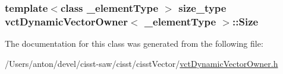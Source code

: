 \subsubsection[{Size}]{\setlength{\rightskip}{0pt plus 5cm}template$<$class \+\_\+element\+Type $>$ size\+\_\+type {\bf vct\+Dynamic\+Vector\+Owner}$<$ \+\_\+element\+Type $>$\+::Size\hspace{0.3cm}{\ttfamily [protected]}}\label{classvct_dynamic_vector_owner_a83223f1718c6ac4f9ec7eda64ba21b2e}


The documentation for this class was generated from the following file\+:\begin{DoxyCompactItemize}
\item 
/\+Users/anton/devel/cisst-\/saw/cisst/cisst\+Vector/\hyperlink{vct_dynamic_vector_owner_8h}{vct\+Dynamic\+Vector\+Owner.\+h}\end{DoxyCompactItemize}
